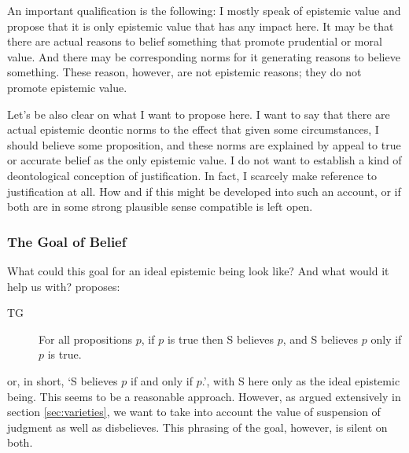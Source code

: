 \documentclass[12pt,numbers=noenddot]{scrartcl}
\begin{document}
An important qualification is the following: I mostly speak of epistemic value and propose that it is only epistemic value that has any impact here. It may be that there are actual reasons to belief something that promote prudential or moral value. And there may be corresponding norms for it generating reasons to believe something. These reason, however, are not epistemic reasons; they do not promote epistemic value.

Let’s be also clear on what I want to propose here. I want to say that there are actual epistemic deontic norms to the effect that given some circumstances, I should believe some proposition, and these norms are explained by appeal to true or accurate belief as the only epistemic value. I do not want to establish a kind of deontological conception of justification. In fact, I scarcely make reference to justification at all. How and if this might be developed into such an account, or if both are in some strong plausible sense compatible is left open.

\subsubsection{The Goal of Belief}\label{sec:goalofbelief}

What could this goal for an ideal epistemic being look like? And what would it help us with? \textcite[157]{David2001-DAVTAT-7} proposes:

\begin{description}
    \item[TG] For all propositions $p$, if $p$ is true then S believes $p$, and S believes $p$ only if $p$ is true.
\end{description}

or, in short, ‘S believes $p$ if and only if $p$.’, with S here only as the ideal epistemic being. This seems to be a reasonable approach. However, as argued extensively in section \ref{sec:varieties}, we want to take into account the value of suspension of judgment as well as disbelieves. This phrasing of the goal, however, is silent on both. 
\end{document}
